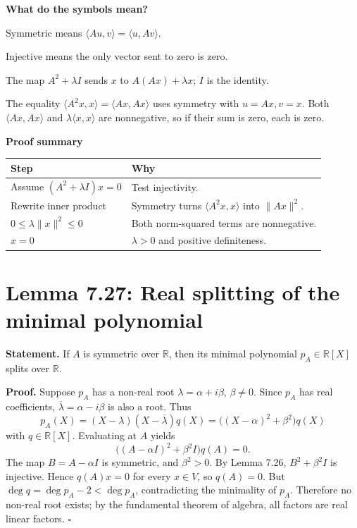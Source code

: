 \documentclass[11pt,a4paper]{article}
\newcommand{\prooftable}[1]{\medskip\textbf{Proof summary}\par\smallskip #1\medskip}
\begin{document}
\begin{personalnote}
\textbf{What do the symbols mean?}

Symmetric means \(\langle Au,v\rangle=\langle u,Av\rangle\).

Injective means the only vector sent to zero is zero.

The map \(A^2+\lambda I\) sends \(x\) to \(A(Ax)+\lambda x\); \(I\) is the identity.

The equality
\(\langle A^2x,x\rangle=\langle Ax,Ax\rangle\)
uses symmetry with \(u=Ax,v=x\).
Both \(\langle Ax,Ax\rangle\) and \(\lambda\langle x,x\rangle\) are nonnegative, so if their sum is zero, each is zero.
\end{personalnote}
\prooftable{\begin{tabularx}{\linewidth}{@{}p{.28\linewidth}X@{}}\hline
Step & Why\\\hline
Assume \((A^2+\lambda I)x=0\) & Test injectivity.\\
Rewrite inner product & Symmetry turns \(\langle A^2x,x\rangle\) into \(\|Ax\|^2\).\\
\(0\leq\lambda\|x\|^2\leq0\) & Both norm-squared terms are nonnegative.\\
\(x=0\) & \(\lambda>0\) and positive definiteness.\\\hline
\end{tabularx}}

\section{Lemma 7.27: Real splitting of the minimal polynomial}
\textbf{Statement.} If \(A\) is symmetric over \(\mathbb R\), then its minimal polynomial \(p_A\in\mathbb R[X]\) splits over \(\mathbb R\).

\textbf{Proof.} Suppose \(p_A\) has a non-real root \(\lambda=\alpha+i\beta\), \(\beta\neq0\).
Since \(p_A\) has real coefficients, \(\overline\lambda=\alpha-i\beta\) is also a root. Thus
\[
p_A(X)=(X-\lambda)(X-\overline\lambda)q(X)
=\big((X-\alpha)^2+\beta^2\big)q(X)
\]
with \(q\in\mathbb R[X]\). Evaluating at \(A\) yields
\[
\big((A-\alpha I)^2+\beta^2I\big)q(A)=0.
\]
The map \(B=A-\alpha I\) is symmetric, and \(\beta^2>0\).
By Lemma 7.26, \(B^2+\beta^2I\) is injective. Hence \(q(A)x=0\) for every \(x\in V\), so \(q(A)=0\).
But \(\deg q=\deg p_A-2<\deg p_A\), contradicting the minimality of \(p_A\). Therefore no non-real root exists; by the fundamental theorem of algebra, all factors are real linear factors. \(\square\)
\end{document}
